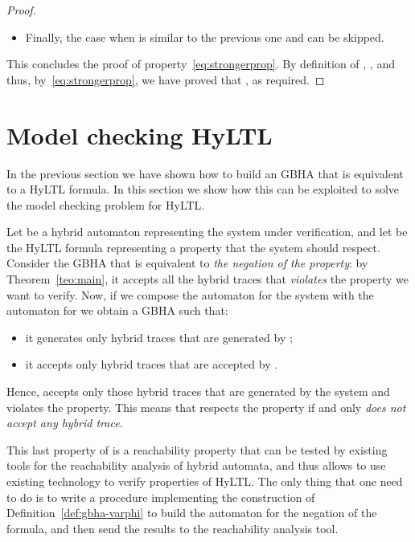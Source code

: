 \documentclass[submission,copyright,creativecommons]{eptcs}
\newcommand{\hyltl}{\textsf{HyLTL}\xspace}
\begin{document}
\begin{proof}
\begin{itemize}
	Now, suppose that . By the semantics of \hyltl, two cases may arise:
	
	\item Finally, the case when  is similar to the previous one and can be skipped.
\end{itemize}

\noindent This concludes the proof of property~\eqref{eq:strongerprop}. By definition of , , and thus, by~\eqref{eq:strongerprop}, we have proved that , as required.
\end{proof}

\section{Model checking \hyltl}

In the previous section we have shown how to build an GBHA that is equivalent to a \hyltl formula. In this section we show how this can be exploited to solve the model checking problem for \hyltl. 

Let  be a hybrid automaton representing the system under verification, and let  be the \hyltl formula representing a property that the system should respect. Consider the GBHA  that is equivalent to \emph{the negation of the property}: by Theorem~\ref{teo:main}, it accepts all the hybrid traces that \emph{violates} the property we want to verify. Now, if we compose the automaton for the system with the automaton for  we obtain a GBHA  such that:
\begin{itemize}
	\item it generates only hybrid traces that are generated by ;
	\item it accepts only hybrid traces that are accepted by .
\end{itemize}

\noindent Hence,  accepts only those hybrid traces that are generated by the system and violates the property. This means that  respects the property   if and only  \emph{does not accept any hybrid trace}.

This last property of  is a reachability property that can be tested by existing tools for the reachability analysis of hybrid automata, and thus allows to use existing technology to verify properties of \hyltl. The only thing that one need to do is to write a procedure implementing the construction of Definition~\ref{def:gbha-varphi} to build the automaton for the negation of the formula, and then send the results to the reachability analysis tool.
\end{document}
